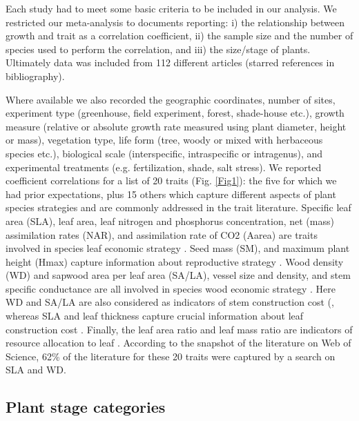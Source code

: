 \documentclass[a4paper]{article}\usepackage[]{graphicx}\usepackage[]{color}
\begin{document}
Each study had to meet some basic criteria to be included in our analysis. We restricted our meta-analysis to documents reporting: i) the relationship between growth and trait as a correlation coefficient, ii) the sample size and the number of species used to perform the correlation, and iii) the size/stage of plants. Ultimately data was included from 112 different articles (starred references in bibliography). 

Where available we also recorded the geographic coordinates, number of sites, experiment type (greenhouse, field experiment, forest, shade-house etc.), growth measure (relative or absolute growth rate measured using plant diameter, height or mass), vegetation type, life form (tree, woody or mixed with herbaceous species etc.), biological scale (interspecific, intraspecific or intragenus), and experimental treatments (e.g. fertilization, shade, salt stress). We reported coefficient correlations for a list of 20 traits (Fig. \ref{Fig1}): the five for which we had prior expectations, plus 15 others which capture different aspects of plant species strategies and are commonly addressed in the trait literature. Specific leaf area (SLA), leaf area, leaf nitrogen and phosphorus concentration, net (mass) assimilation rates (NAR), and assimilation rate of CO2 (Aarea) are traits involved in species leaf economic strategy \citep{Wright:2004jb,Wright:2010tp}. Seed mass (SM), and maximum plant height (Hmax) capture information about reproductive strategy \citep{Falster:2005bw,Moles:2006ft}. Wood density (WD) and sapwood area per leaf area (SA/LA), vessel size and density, and stem specific conductance are all involved in species wood economic strategy  \citep{Chave:2009iy}. Here WD and SA/LA are also considered as indicators of stem construction cost (\citep{Falster:2011ii}, whereas SLA and leaf thickness capture crucial information about leaf construction cost \citep{Wright:2004jb}. Finally, the leaf area ratio and leaf mass ratio are indicators of resource allocation to leaf \citep{Lambers:1992bj}. According to the snapshot of the literature on Web of Science, 62\% of the literature for these 20 traits were captured by a search on SLA and WD.


\subsection*{Plant stage categories}\label{plant-stage-categories}
\end{document}
